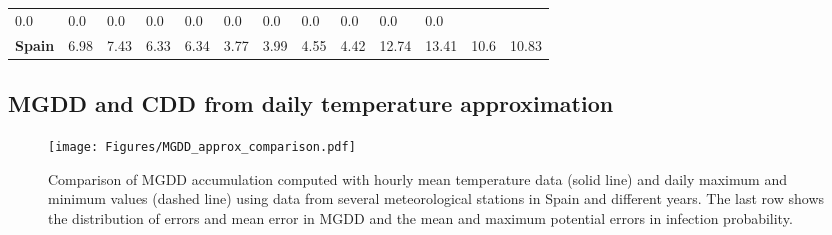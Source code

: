 \begin{table}[H]
{\begin{tabular}{lllllllllllll}
            0.0                                                &
            0.0                                                &
            0.0                                                &
            0.0                                                &
            0.0                                                &
            0.0                                                &
            0.0                                                &
            0.0                                                &
            0.0                                                &
            0.0                                                &
            0.0                                                  \\
            \textbf{Spain}                                     &
            6.98                                               &
            7.43                                               &
            6.33                                               &
            6.34                                               &
            3.77                                               &
            3.99                                               &
            4.55                                               &
            4.42                                               &
            12.74                                              &
            13.41                                              &
            10.6                                               &
            10.83                                                \\ \hline
        \end{tabular}%
    }
\end{table}

\subsection{MGDD and CDD from daily temperature approximation}

\begin{figure}[H]
    \centering
    \texttt{[image: Figures/MGDD\_approx\_comparison.pdf]}
    \caption{Comparison of MGDD accumulation computed with hourly mean
        temperature data (solid line) and daily maximum and minimum values
        (dashed
        line) using data from several meteorological stations in Spain and
        different
        years. The last row shows the distribution of errors and mean error in
        MGDD and
        the mean and maximum potential errors in infection probability.}
    \label{fig:MGDD_app}
\end{figure}

